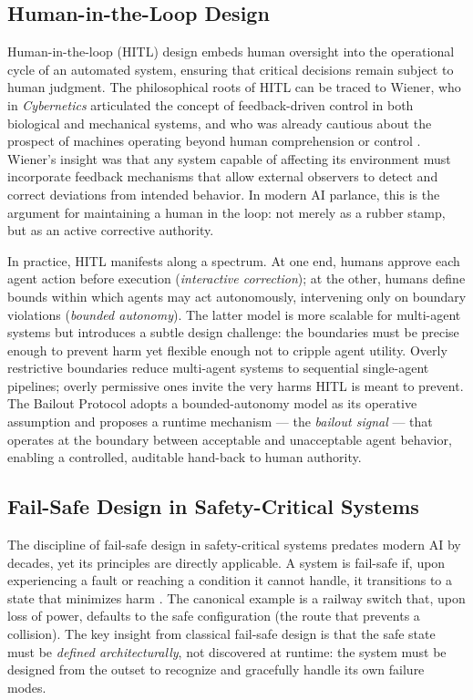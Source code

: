 \subsection{Human-in-the-Loop Design}

Human-in-the-loop (HITL) design embeds human oversight into the operational cycle of an automated system, ensuring that critical decisions remain subject to human judgment. The philosophical roots of HITL can be traced to Wiener, who in \emph{Cybernetics} articulated the concept of feedback-driven control in both biological and mechanical systems, and who was already cautious about the prospect of machines operating beyond human comprehension or control \cite{wiener1948}. Wiener's insight was that any system capable of affecting its environment must incorporate feedback mechanisms that allow external observers to detect and correct deviations from intended behavior. In modern AI parlance, this is the argument for maintaining a human in the loop: not merely as a rubber stamp, but as an active corrective authority.

In practice, HITL manifests along a spectrum. At one end, humans approve each agent action before execution (\emph{interactive correction}); at the other, humans define bounds within which agents may act autonomously, intervening only on boundary violations (\emph{bounded autonomy}). The latter model is more scalable for multi-agent systems but introduces a subtle design challenge: the boundaries must be precise enough to prevent harm yet flexible enough not to cripple agent utility. Overly restrictive boundaries reduce multi-agent systems to sequential single-agent pipelines; overly permissive ones invite the very harms HITL is meant to prevent. The Bailout Protocol adopts a bounded-autonomy model as its operative assumption and proposes a runtime mechanism — the \emph{bailout signal} — that operates at the boundary between acceptable and unacceptable agent behavior, enabling a controlled, auditable hand-back to human authority.

\subsection{Fail-Safe Design in Safety-Critical Systems}

The discipline of fail-safe design in safety-critical systems predates modern AI by decades, yet its principles are directly applicable. A system is fail-safe if, upon experiencing a fault or reaching a condition it cannot handle, it transitions to a state that minimizes harm \cite{dijkstra1982}. The canonical example is a railway switch that, upon loss of power, defaults to the safe configuration (the route that prevents a collision). The key insight from classical fail-safe design is that the safe state must be \emph{defined architecturally}, not discovered at runtime: the system must be designed from the outset to recognize and gracefully handle its own failure modes.

